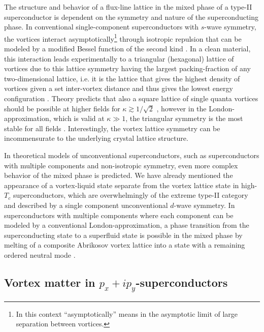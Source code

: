 The structure and behavior of a flux-line lattice in the mixed phase of a type-II superconductor is dependent on the symmetry and nature of the superconducting phase. In conventional single-component
superconductors with $s$-wave symmetry, the vortices interact asymptotically\footnote{In this context ``asymptotically'' means in the asymptotic limit of large separation between vortices.}
through isotropic repulsion that can be modeled by a modified Bessel function of the second kind \cite{Abrikosov56,Kramer71,Chaves11}. In a clean material, this interaction leads experimentally
to a triangular (hexagonal) lattice of vortices due to this lattice symmetry having the largest packing-fraction of any
two-dimensional lattice, i.e. it is the lattice that gives the highest density of vortices given a set inter-vortex distance and thus gives the lowest energy configuration \cite{Cribier66,Essmann67}.
Theory predicts that also a square lattice of single quanta vortices should be possible at higher fields for $\kappa \gtrsim 1/\sqrt{2}$ \cite{Kramer71}, however in the London-approximation,
which is valid at $\kappa\gg1$, the triangular symmetry is the most stable for all fields \cite{Matricon64}.
Interestingly, the vortex lattice symmetry can be incommensurate to the underlying crystal lattice structure.

In theoretical models of unconventional superconductors, such as superconductors with multiple components and non-isotropic symmetry, even more complex behavior of the mixed phase is predicted.
We have already mentioned the appearance of a vortex-liquid state separate from the vortex lattice state in high-$T_c$ superconductors, which are overwhelmingly of the extreme type-II category
and described by a single component unconventional $d$-wave symmetry.
In superconductors with multiple components where each component can be modeled by a conventional London-approximation, a phase transition from the superconducting state to a superfluid state is possible
in the mixed phase by melting of a composite Abrikosov vortex lattice into a state with a remaining ordered neutral mode \cite{Smiseth05}.

\subsection{Vortex matter in $p_x+ip_y$-superconductors}

